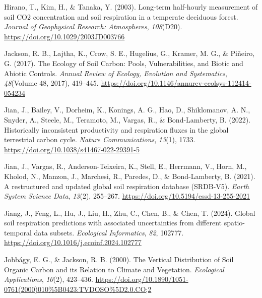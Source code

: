 \documentclass[
  letterpaper,
  DIV=11,
  numbers=noendperiod]{scrartcl}
\newlength{\cslhangindent}
\newenvironment{CSLReferences}[2] %
 {\begin{list}{}{%
  \setlength{\itemindent}{0pt}
  \setlength{\leftmargin}{0pt}
  \setlength{\parsep}{0pt}
  \ifodd #1
   \setlength{\leftmargin}{\cslhangindent}
   \setlength{\itemindent}{-1\cslhangindent}
  \fi
  \setlength{\itemsep}{#2\baselineskip}}}
 {\end{list}}
\providecommand{\DIFaddbegin}{} %
\providecommand{\DIFaddend}{} %
\providecommand{\DIFdelbegin}{} %
\providecommand{\DIFdelend}{} %
\newcommand{\DIFscaledelfig}{0.5}
\newlength{\DIFdelgraphicswidth} %
\newlength{\DIFdelgraphicsheight} %
\newcommand{\DIFaddincludegraphics}[2][]{{\color{blue}\fbox{\DIFOincludegraphics[#1]{#2}}}} %
\newcommand{\DIFdelincludegraphics}[2][]{%
\sbox{\DIFdelgraphicsbox}{\DIFOincludegraphics[#1]{#2}}%
\settoboxwidth{\DIFdelgraphicswidth}{\DIFdelgraphicsbox} %
\settoboxtotalheight{\DIFdelgraphicsheight}{\DIFdelgraphicsbox} %
\scalebox{\DIFscaledelfig}{%
\parbox[b]{\DIFdelgraphicswidth}{\usebox{\DIFdelgraphicsbox}\\[-\baselineskip] \rule{\DIFdelgraphicswidth}{0em}}\llap{\resizebox{\DIFdelgraphicswidth}{\DIFdelgraphicsheight}{%
\setlength{\unitlength}{\DIFdelgraphicswidth}%
\begin{picture}(1,1)%
\thicklines\linethickness{2pt} %
{\color[rgb]{1,0,0}\put(0,0){\framebox(1,1){}}}%
{\color[rgb]{1,0,0}\put(0,0){\line( 1,1){1}}}%
{\color[rgb]{1,0,0}\put(0,1){\line(1,-1){1}}}%
\end{picture}%
}\hspace*{3pt}}} %
} %
\DeclareRobustCommand{\DIFaddbegin}{\DIFOaddbegin \let\includegraphics\DIFaddincludegraphics} %
\DeclareRobustCommand{\DIFaddend}{\DIFOaddend \let\includegraphics\DIFOincludegraphics} %
\DeclareRobustCommand{\DIFdelbegin}{\DIFOdelbegin \let\includegraphics\DIFdelincludegraphics} %
\DeclareRobustCommand{\DIFdelend}{\DIFOaddend \let\includegraphics\DIFOincludegraphics} %
\begin{document}
\begin{CSLReferences}{1}{0}
\DIFdelbegin {}
\DIFdelend \DIFaddbegin {}
\DIFaddend Hirano, T., Kim, H., \& Tanaka, Y. (2003). Long-term half-hourly
measurement of soil {CO2} concentration and soil respiration in a
temperate deciduous forest. \emph{Journal of Geophysical Research:
Atmospheres}, \emph{108}(D20).
\url{https://doi.org/10.1029/2003JD003766}

Jackson, R. B., Lajtha, K., Crow, S. E., Hugelius, G., Kramer, M. G., \&
Piñeiro, G. (2017). The {Ecology} of {Soil Carbon}: {Pools},
{Vulnerabilities}, and {Biotic} and {Abiotic Controls}. \emph{Annual
Review of Ecology, Evolution and Systematics}, \emph{48}(Volume 48,
2017), 419--445.
\url{https://doi.org/10.1146/annurev-ecolsys-112414-054234}

Jian, J., Bailey, V., Dorheim, K., Konings, A. G., Hao, D., Shiklomanov,
A. N., Snyder, A., Steele, M., Teramoto, M., Vargas, R., \&
Bond-Lamberty, B. (2022). Historically inconsistent productivity and
respiration fluxes in the global terrestrial carbon cycle. \emph{Nature
Communications}, \emph{13}(1), 1733.
\url{https://doi.org/10.1038/s41467-022-29391-5}

Jian, J., Vargas, R., Anderson-Teixeira, K., Stell, E., Herrmann, V.,
Horn, M., Kholod, N., Manzon, J., Marchesi, R., Paredes, D., \&
Bond-Lamberty, B. (2021). A restructured and updated global soil
respiration database ({SRDB-V5}). \emph{Earth System Science Data},
\emph{13}(2), 255--267. \url{https://doi.org/10.5194/essd-13-255-2021}

Jiang, J., Feng, L., Hu, J., Liu, H., Zhu, C., Chen, B., \& Chen, T.
(2024). Global soil respiration predictions with associated
uncertainties from different spatio-temporal data subsets.
\emph{Ecological Informatics}, \emph{82}, 102777.
\url{https://doi.org/10.1016/j.ecoinf.2024.102777}

Jobbágy, E. G., \& Jackson, R. B. (2000). The {Vertical Distribution} of
{Soil Organic Carbon} and its {Relation} to {Climate} and {Vegetation}.
\emph{Ecological Applications}, \emph{10}(2), 423--436.
\url{https://doi.org/10.1890/1051-0761(2000)010\%5B0423:TVDOSO\%5D2.0.CO;2}


\end{CSLReferences}
\end{document}
